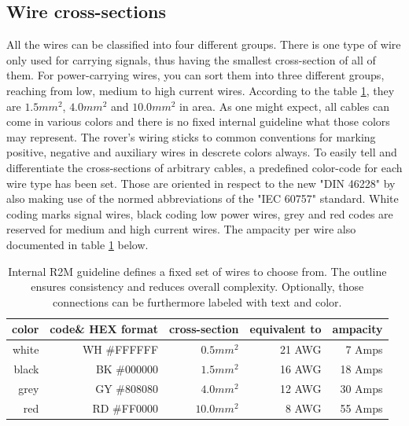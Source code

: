     \clearpage %

    \subsection{Wire cross-sections}

    All the wires can be classified into four different groups. There is one type of wire only used for carrying signals, thus having the smallest cross-section of all of them. For power-carrying wires, you can sort them into three different groups, reaching from low, medium to high current wires. According to the table \ref{color_codes}, they are $1.5mm^2$, $4.0mm^2$ and $10.0mm^2$ in area. As one might expect, all cables can come in various colors and there is no fixed internal guideline what those colors may represent. The rover's wiring sticks to common conventions for marking positive, negative and auxiliary wires in descrete colors always. To easily tell and differentiate the cross-sections of arbitrary cables, a predefined color-code for each wire type has been set. Those are oriented in respect to the new "DIN 46228" by also making use of the normed abbreviations of the "IEC 60757" standard. White coding marks signal wires, black coding low power wires, grey and red codes are reserved for medium and high current wires. The ampacity per wire also documented in table \ref{color_codes} below.
    
    \begin{table}[h] %
        \centering
        \begin{tabular}{|r|r|r|r|r|} \hline 
          color\footnotemark[1]&  code\footnotemark[2] \& HEX format&  cross-section\footnotemark[3]&  equivalent to&  ampacity\footnotemark[4] \\ \hline 
                          white&          WH \#FFFFFF&                    $0.5mm^2$&                          21 AWG&                 7 Amps    \\ \hline 
                          black&          BK \#000000&                    $1.5mm^2$&                          16 AWG&                18 Amps    \\ \hline 
                           grey&          GY \#808080&                    $4.0mm^2$&                          12 AWG&                30 Amps    \\ \hline 
                            red&          RD \#FF0000&                   $10.0mm^2$&                           8 AWG&                55 Amps    \\ \hline
        \end{tabular}
        \caption{Internal R2M guideline defines a fixed set of wires to choose from. The outline ensures consistency and reduces overall complexity. Optionally, those connections can be furthermore labeled with text and color.}
        \label{color_codes}
    \end{table}

